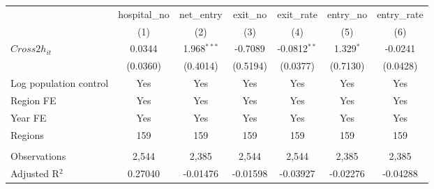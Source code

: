 \begingroup
\centering
\begin{tabular}{lcccccc}
   \toprule
                          & hospital\_no  & net\_entry    & exit\_no  & exit\_rate     & entry\_no   & entry\_rate \\    
                          & (1)           & (2)           & (3)       & (4)            & (5)         & (6)\\  
   \midrule 
   $Cross2h_{it}$         & 0.0344        & 1.968$^{***}$ & -0.7089   & -0.0812$^{**}$ & 1.329$^{*}$ & -0.0241\\   
                          & (0.0360)      & (0.4014)      & (0.5194)  & (0.0377)       & (0.7130)    & (0.0428)\\   
   Log population control & Yes           & Yes           & Yes       & Yes            & Yes         & Yes\\  
   Region FE              & Yes           & Yes           & Yes       & Yes            & Yes         & Yes\\  
   Year FE                & Yes           & Yes           & Yes       & Yes            & Yes         & Yes\\  
   Regions                & 159           & 159           & 159       & 159            & 159         & 159\\  
    \\
   Observations           & 2,544         & 2,385         & 2,544     & 2,544          & 2,385       & 2,385\\  
   Adjusted R$^2$         & 0.27040       & -0.01476      & -0.01598  & -0.03927       & -0.02276    & -0.04288\\  
   \bottomrule
\end{tabular}
\par\endgroup
